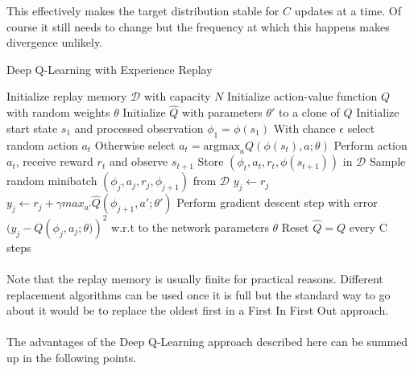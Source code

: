 This effectively makes the target distribution stable
for $C$ updates at a time.
Of course it still needs to change
but the frequency at which this happens
makes divergence unlikely.

\begin{algorithm}
  \caption{Deep Q-Learning with Experience Replay}
\label{algo:deep_q_learning}
\begin{algorithmic}
  \State Initialize replay memory $\mathcal{D}$ with capacity $N$
  \State Initialize action-value function $Q$ with random weights $\theta$
  \State Initialize $\hat{Q}$ with parameters $\theta'$ to a clone of $Q$
    \State Initialize start state $s_1$ and processed observation $\phi_1 = \phi(s_1)$
      \State With chance $\epsilon$ select random action $a_t$
      \State Otherwise select $a_t = \text{argmax}_a Q(\phi(s_t), a; \theta)$
      \State Perform action $a_t$, receive reward $r_t$ and observe $s_{t+1}$
      \State Store $(\phi_t, a_t, r_t, \phi(s_{t+1}))$ in $\mathcal{D}$
      \State Sample random minibatch $(\phi_j, a_j, r_j, \phi_{j+1})$ from $\mathcal{D}$
        \State $y_j \gets r_j$
      \Else
      \State $y_j \gets r_j + \gamma max_{a'} \hat{Q}(\phi_{j+1}, a';\theta')$
      \EndIf
      \State Perform gradient descent step with error
      $(y_j-Q\left(\phi_j,a_j;\theta)\right)^2$
      w.r.t to the network parameters $\theta$
      \State Reset $\hat{Q} = Q$ every C steps
    \EndFor
  \EndFor
\end{algorithmic}
\end{algorithm}

\paragraph{}
Note that the replay memory is usually finite for practical reasons.
Different replacement algorithms can be used once it is full
but the standard way to go about it
would be to replace the oldest first
in a First In First Out approach.

\paragraph{}
The advantages of the Deep Q-Learning approach described here
can be summed up in the following points.

